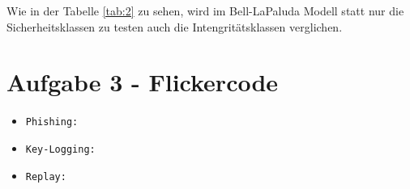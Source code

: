 \documentclass{scrartcl}
\begin{document}
Wie in der Tabelle \ref{tab:2} zu sehen, wird im Bell-LaPaluda Modell statt nur die Sicherheitsklassen zu testen auch die Intengritätsklassen verglichen.

\section*{Aufgabe 3 - Flickercode}

\begin{itemize}
\item \texttt{Phishing:}
\item \texttt{Key-Logging:}
\item \texttt{Replay:}
\end{itemize}
\end{document}

